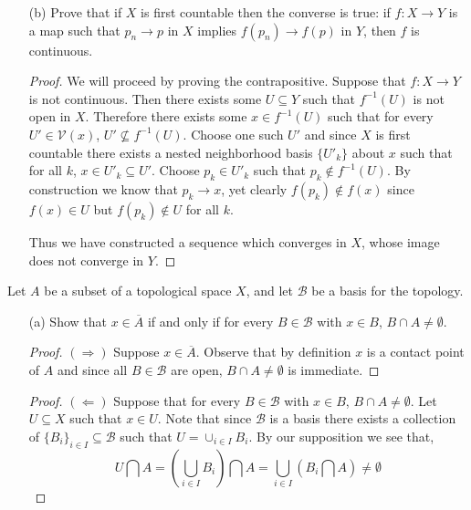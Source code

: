 \documentclass[minion]{homework651}
\def\calB{\mathcal{B}}
\begin{document}
\begin{problems}
\begin{enumerate}
    \item[(b)] Prove that if $X$ is first countable then the converse is true: if $f: X \to Y$ is a map such that $p_n \to p$ in $X$ implies $f(p_n) \to f(p)$ in $Y$, then $f$ is continuous. 
    \begin{proof}We will proceed by proving the contrapositive. 
        Suppose that $f:X \to Y$ is not continuous. Then there exists some $U \subseteq Y$ such that $f^{-1}(U)$ is not open in $X$. Therefore there exists some $x \in f^{-1}(U)$ such that for every $U' \in \mathcal{V}(x)$, $U' \not\subseteq f^{-1}(U)$. Choose one such $U'$ and since $X$ is first countable there exists a nested neighborhood basis $\{U'_k\}$ about $x$ such that for all $k$, $x \in U'_k \subseteq U'$. Choose $p_k \in U'_k$ such that $p_k \not\in f^{-1}(U)$. By construction we know that $p_k \to x$, yet clearly $f(p_k) \not\in f(x)$ since $f(x) \in U$ but $f(p_k) \not\in U$ for all $k$. 
        

        Thus we have constructed a sequence which converges in $X$, whose image does not converge in $Y$.
    \end{proof}
\end{enumerate}

\problem Let $A$ be a subset of a topological space $X$, and let $\calB$ be a basis for the topology. 
\begin{enumerate}
    \item[(a)] Show that $x \in \overline{A}$ if and only if for every $B \in \calB$ with $x \in B$, $B \cap A \neq \emptyset$. 
    \begin{proof} $(\Rightarrow)$ Suppose $x \in \overline{A}$. Observe that by definition $x$ is a contact point of $A$ and since all $B \in \calB$ are open, 
    $B \cap A \neq \emptyset$ is immediate. 
    \end{proof}

    \begin{proof}$(\Leftarrow)$ Suppose that for every $B \in \calB$ with $x \in B$, $B \cap A \neq \emptyset$. Let $U \subseteq X$ such that $x \in U$. Note that since $\calB$ is a basis there exists a collection of $\{B_i\}_{i \in I} \subseteq \calB$
    such that $U = \cup_{i \in I}B_i$. By our supposition we see that, 
    \begin{equation*}
        U \bigcap A = \left(\bigcup_{i \in I}B_i\right) \bigcap A = \bigcup_{i \in I} \left( B_i \bigcap A\right) \neq \emptyset
    \end{equation*} 
    \end{proof}


\end{enumerate}
\end{problems}
\end{document}
